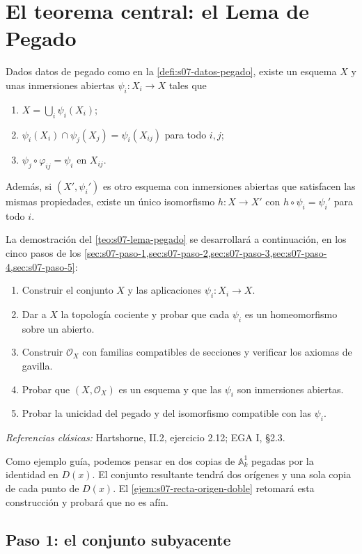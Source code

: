 \section{El teorema central: el Lema de Pegado}

\begin{teo}
\label{teo:s07-lema-pegado}
Dados datos de pegado como en la \cref{defi:s07-datos-pegado}, existe un esquema $X$ y unas inmersiones abiertas $\psi_i\colon X_i\to X$ tales que
\begin{enumerate}[label=(\alph*)]
\item $X=\bigcup_i\psi_i(X_i)$;
\item $\psi_i(X_i)\cap\psi_j(X_j)=\psi_i(X_{ij})$ para todo $i,j$;
\item $\psi_j\circ\varphi_{ij}=\psi_i$ en $X_{ij}$.
\end{enumerate}
Además, si $(X',\psi_i')$ es otro esquema con inmersiones abiertas que satisfacen las mismas propiedades, existe un único isomorfismo $h\colon X\to X'$ con $h\circ\psi_i=\psi_i'$ para todo $i$.
\end{teo}
La demostración del \cref{teo:s07-lema-pegado} se desarrollará a continuación, en los cinco pasos de los \cref{sec:s07-paso-1,sec:s07-paso-2,sec:s07-paso-3,sec:s07-paso-4,sec:s07-paso-5}:
\begin{enumerate}
\item Construir el conjunto $X$ y las aplicaciones $\psi_i\colon X_i\to X$.
\item Dar a $X$ la topología cociente y probar que cada $\psi_i$ es un homeomorfismo sobre un abierto.
\item Construir $\mathcal O_X$ con familias compatibles de secciones y verificar los axiomas de gavilla.
\item Probar que $(X,\mathcal O_X)$ es un esquema y que las $\psi_i$ son inmersiones abiertas.
\item Probar la unicidad del pegado y del isomorfismo compatible con las $\psi_i$.
\end{enumerate}
\emph{Referencias clásicas:} Hartshorne, II.2, ejercicio 2.12; EGA I, \S2.3.

Como ejemplo guía, podemos pensar en dos copias de $\mathbb A_k^1$ pegadas por la identidad en $D(x)$. El conjunto resultante tendrá dos orígenes y una sola copia de cada punto de $D(x)$. El \cref{ejem:s07-recta-origen-doble} retomará esta construcción y probará que no es afín.

\subsection{Paso 1: el conjunto subyacente}
\label{sec:s07-paso-1}

